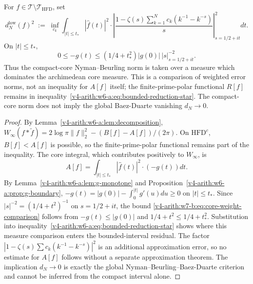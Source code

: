 \begin{theorem}
\label{v4-arith:w7-b:thm:complement-to-BD}
For
\(f\in
\mathscr T\setminus\mathscr T_{\mathrm{HFD}}\),
set
\begin{equation}
\label{v4-arith:w7-b:eq:complement-BD}
d_{N}^{\mathrm{low}}(f)^{2}\;:=\;\inf_{c_{k}}\int_{|t|\leq t_{\ast}}\!|\widehat{f}(t)|^{2}\cdot\!\left|\frac{1-\zeta(s)\sum_{k=1}^{N}c_k(k^{-1}-k^{-s})}{s}\right|_{s=1/2+it}^{2}dt.
\end{equation}
On \(|t|\leq t_{\ast}\),
\begin{equation}
\label{v4-arith:w7-b:eq:core-weight-comparison}
0\leq -g(t)\leq
(1/4+t_{\ast}^{2})|g(0)|\,|s|^{-2}_{s=1/2+it}.
\end{equation}
Thus the compact-core Nyman--Beurling norm is taken over a measure
which dominates the archimedean core measure. This is a comparison of
weighted error norms, not an inequality for \(A[f]\) itself; the
finite-prime-polar functional \(R[f]\) remains in
inequality~\eqref{v4-arith:w6-a:eq:bounded-reduction-star}. The compact-core norm
does not imply the global Baez-Duarte vanishing \(d_N\to0\).
\end{theorem}

\begin{proof}
By Lemma~\ref{v4-arith:w6-a:lem:decomposition},
\(W_{\infty}(f*\widetilde{f})=2\log\pi\|f\|_2^2-(B[f]-A[f])/(2\pi)\). On
\(\mathrm{HFD}^{c}\), \(B[f]<A[f]\) is possible, so the
finite-prime-polar functional remains part of the inequality. The
core integral, which contributes positively to \(W_\infty\), is
\[
A[f]=\int_{|t|\leq t_{\ast}}|\widehat{f}(t)|^{2}\cdot(-g(t))dt.
\]
By Lemma~\ref{v4-arith:w6-a:lem:g-monotone} and
Proposition~\ref{v4-arith:w6-a:prop:g-boundary},
\(-g(t)=|g(0)|-\int_{0}^{|t|}g'(u)du\geq 0\) on
\(|t|\leq t_{\ast}\). Since
\(|s|^{-2}=(1/4+t^{2})^{-1}\) on \(s=1/2+it\), the bound
\eqref{v4-arith:w7-b:eq:core-weight-comparison} follows from
\(-g(t)\leq |g(0)|\) and
\(1/4+t^{2}\leq 1/4+t_{\ast}^{2}\). Substitution into
inequality~\eqref{v4-arith:w6-a:eq:bounded-reduction-star} shows where this
measure comparison enters the bounded-interval residual. The factor
\(\left|1-\zeta(s)\sum c_k(k^{-1}-k^{-s})\right|^2\) is an additional
approximation error, so no estimate for \(A[f]\) follows without a
separate approximation theorem. The implication \(d_N\to0\) is exactly
the global Nyman--Beurling--Baez-Duarte criterion and cannot be
inferred from the compact interval alone.
\end{proof}

